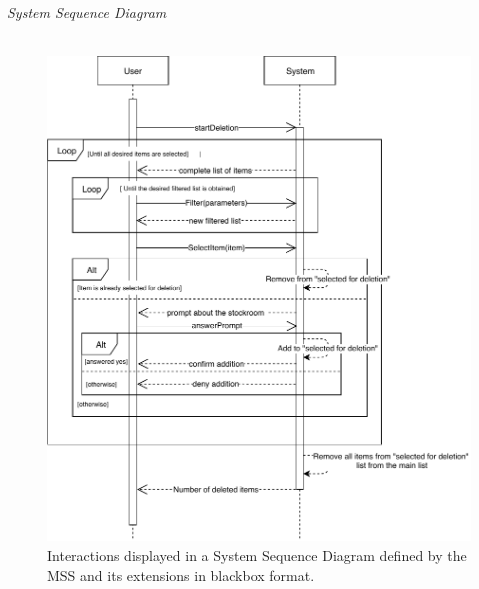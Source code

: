 \textsl{System Sequence Diagram}\\\\
\begin{figure}[H]
	\centering
	\includegraphics[scale=1]{SD-bb-delete.pdf}
	\caption*{Interactions displayed in a System Sequence Diagram defined by the MSS and its extensions in blackbox format.}
\end{figure}